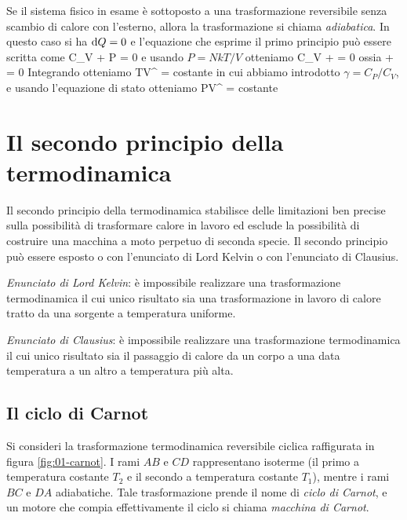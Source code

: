 Se il sistema fisico in esame è sottoposto a una trasformazione reversibile senza scambio di calore con l'esterno, allora la trasformazione si chiama {\em adiabatica}. In questo caso si ha ${\textrm d}Q = 0$ e l'equazione che esprime il primo principio può essere scritta come
\be
\label{eq:01-adiabatica-uno}
C_{V} + P = 0 
\ee
e usando $P = NkT/V$ otteniamo
\be
C_{V} +  = 0 
\ee
ossia
\be
{} +  = 0 
\ee
Integrando otteniamo
\be
\label{eq:01-adiabatica-due}
TV^{} = \textrm{costante} 
\ee
in cui abbiamo introdotto $\gamma = C_{P}/C_{V}$, e usando l'equazione di stato otteniamo
\be
\label{eq:01-adiabatica-tre}
PV^{\gamma} = \textrm{costante} 
\ee

\section{Il secondo principio della termodinamica}
\label{sec:01-secondo}

Il secondo principio della termodinamica stabilisce delle limitazioni ben precise sulla possibilità di trasformare calore in lavoro ed esclude la possibilità di costruire una macchina a moto perpetuo di seconda specie. Il secondo principio può essere esposto o con l'enunciato di Lord Kelvin o con l'enunciato di Clausius. 

{\em Enunciato di Lord Kelvin}: è impossibile realizzare una trasformazione termodinamica il cui unico risultato sia una trasformazione in lavoro di calore tratto da una sorgente a temperatura uniforme.

{\em Enunciato di Clausius}: è impossibile realizzare una trasformazione termodinamica il cui unico risultato sia il passaggio di calore da un corpo a una data temperatura a un altro a temperatura più alta.

\subsection{Il ciclo di Carnot}

Si consideri la trasformazione termodinamica reversibile ciclica raffigurata in figura \ref{fig:01-carnot}. I rami $AB$ e $CD$ rappresentano isoterme (il primo a temperatura costante $T_{2}$ e il secondo a temperatura costante $T_{1}$), mentre i rami $BC$ e $DA$ adiabatiche. Tale trasformazione prende il nome di {\em ciclo di Carnot}, e un motore che compia effettivamente il ciclo si chiama {\em macchina di Carnot}.

